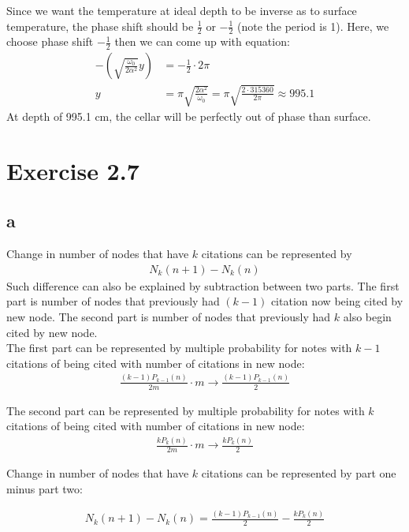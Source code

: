 \documentclass[11pt,letterpaper]{article}
\begin{document}
\noindent Since we want the temperature at ideal depth to be inverse as to surface temperature, the phase shift should be $\frac{1}{2}$ or $- \frac{1}{2}$ (note the period is 1). Here, we choose phase shift $- \frac{1}{2}$ then we can come up with equation:
\begin{align*}
- (\sqrt{\frac{\omega_0}{2 \alpha^2}} y) &= - \frac{1}{2} \cdot 2 \pi \\
y &= \pi \sqrt{\frac{2 \alpha^2}{\omega_0}} = \pi \sqrt{\frac{2 \cdot 315360}{2 \pi}} \approx 995.1
\end{align*}
\noindent At depth of 995.1 cm, the cellar will be perfectly out of phase than surface. 


\newpage
\section*{Exercise 2.7}
\subsection*{a}
\noindent Change in number of nodes that have $k$ citations can be represented by 
\begin{align*}
N_k(n + 1) - N_k(n) 
\end{align*}
\noindent Such difference can also be explained by subtraction between two parts. The first part is number of nodes that previously had $(k - 1)$ citation now being cited by new node. The second part is number of nodes that previously had $k$ also begin cited by new node. \\

\noindent The first part can be represented by multiple probability for notes with $k-1$ citations of being cited with number of citations in new node:
\begin{align*}
\frac{(k - 1) P_{k - 1}(n)}{2m} \cdot m \rightarrow \frac{(k - 1) P_{k - 1}(n)}{2}
\end{align*}

\noindent The second part can be represented by multiple probability for notes with $k$ citations of being cited with number of citations in new node:
\begin{align*}
\frac{k P_{k}(n)}{2m} \cdot m \rightarrow \frac{k P_{k}(n)}{2} 
\end{align*}

\noindent Change in number of nodes that have $k$ citations can be represented by part one minus part two:

\begin{align*}
N_k(n + 1) - N_k(n) = \frac{(k - 1) P_{k - 1}(n)}{2} - \frac{k P_{k}(n)}{2} 
\end{align*} \\
\end{document}

